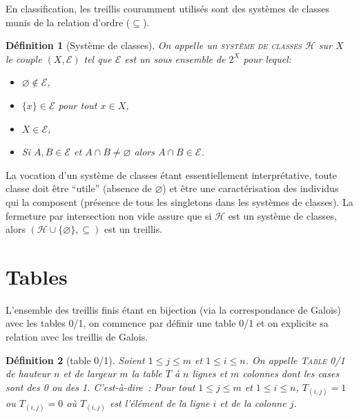 \documentclass[a4paper]{report}
\newtheorem{definition}{Définition}[chapter]
\begin{document}
En classification, les treillis couramment utilisés sont des systèmes de classes munis de la relation d'ordre ($\subseteq$).

\begin{definition}[Système de classes]

\label{sysclass}
On appelle un \textsc{système de classes}  $\mathcal{H}$ sur $X$ le couple $(X, \mathcal{E})$ tel que $\mathcal{E}$ est un sous ensemble de $2^X$
pour lequel:

\begin{itemize}
 \item $\varnothing \notin \mathcal{E}$,
 \item $\{x\} \in \mathcal{E}$ pour tout $x \in X$,
 \item $X \in \mathcal{E}$,
 \item Si $A, B \in \mathcal{E}$ et $A \cap B \neq \varnothing $ alors $A \cap B \in \mathcal{E}$.
\end{itemize}

\end{definition}

La vocation d'un système de classes étant essentiellement interprétative, toute classe doit \^etre ``utile'' (absence de $\varnothing$)
et \^etre une caractérisation des individus qui la composent (présence de tous les singletons dans les systèmes de classes).
La fermeture par intersection non vide assure que si $\mathcal{H}$ est un système de classes, alors $(\mathcal{H} \cup \{\varnothing\}, \subseteq)$ est un treillis.

\section{Tables}

L'ensemble des treillis finis étant en bijection (via la correspondance de Galois) avec les tables 0/1, 
 on commence par définir une table 0/1 et on explicite sa relation avec les treillis de Galois.

\begin{definition}[table 0/1]

Soient $1 \leq j \leq m$ et $1 \leq i \leq n$. On appelle \textsc{Table 0/1} de hauteur $n$ et de largeur $m$ la table $T$ à $n$ lignes et $m$ colonnes dont les 
cases sont des 0 ou des 1.
 C'est-à-dire~:
Pour tout $1 \leq j \leq m$ et $1 \leq i \leq n$, $T_{(i, j)} = 1$ ou $T_{(i, j)} = 0$ 
 où $T_{(i, j)}$ est l'élément de la ligne $i$ et de la colonne $j$.
\end{definition}
\end{document}
